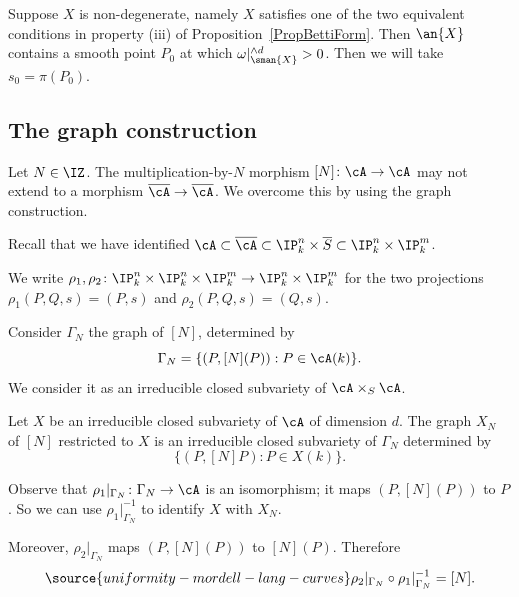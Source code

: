 \begin{remark}
\notready
  \label{rmk:nondeg}
  Suppose $X$ is non-degenerate, namely $X$ satisfies one of the two
  equivalent conditions in property (iii) of
  Proposition~\ref{PropBettiForm}. Then $\an{X}$ contains a smooth
  point $P_0$ at which $\omega|_{\sman{X}}^{\wedge d}>0$. Then we will
  take $s_0=\pi(P_0)$.
\end{remark}



\subsection{The graph construction}
\label{ss:graph}

Let $N\in\IZ$. The multiplication-by-$N$ morphism $[N] \colon \cA\rightarrow \cA$ may not
extend to a morphism $\overline{\cA}\rightarrow \overline{\cA}$. We
overcome this by using the graph construction.

Recall that we have identified
$\cA\subset\overline{\cA}\subset \IP_k^n\times \overline{S}
\subset\IP_k^n\times\IP_k^m$.

We write
$\rho_1,\rho_2\colon \IP_k^n\times\IP_k^n \times \IP_k^m \rightarrow
\IP_k^n\times \IP_k^m$ for the
 two projections $\rho_1(P,Q,s)=(P,s)$ and $\rho_2(P,Q,s)=(Q,s)$.


Consider $\Gamma_N$ the graph of $[N]$, determined by
\begin{equation*}
  \Gamma_N = \{ (P,[N](P)) : P \in \cA(k) \}.
\end{equation*}
We consider it as an irreducible closed subvariety of
$\cA\times_S\cA$.

Let $X$ be an irreducible closed subvariety of $\cA$ of dimension $d$.
The graph $X_N$ of $[N]$ restricted to $X$ is
an irreducible closed  subvariety of $\Gamma_N$ determined by
\begin{equation*}
   \{(P,[N]P): P \in X(k) \}.
\end{equation*}


Observe that $\rho_1|_{\Gamma_N} \colon \Gamma_N\rightarrow \cA$ is an isomorphism; it maps $(P,[N](P))$ to $P$.  %
So we can use $\rho_1|_{\Gamma_N}^{-1}$ to identify $X$ with $X_N$.


Moreover, $\rho_2|_{\Gamma_N}$ maps $(P,[N](P))$ to $[N](P)$. Therefore
\begin{equation}
\label{eq:relatetoN}
\source{uniformity-mordell-lang-curves}
  \rho_2|_{\Gamma_N} \circ \rho_1|_{\Gamma_N}^{-1} = [N].
\end{equation}


